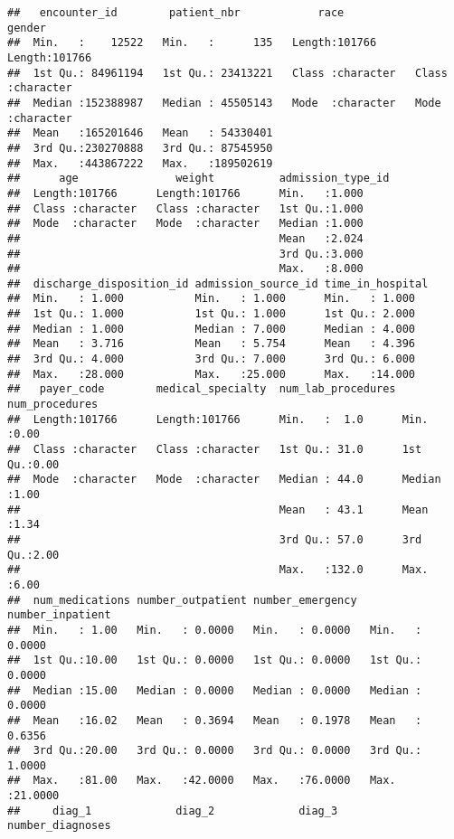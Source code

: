 \documentclass[
]{article}
\begin{document}
\begin{verbatim}
##   encounter_id        patient_nbr            race              gender         
##  Min.   :    12522   Min.   :      135   Length:101766      Length:101766     
##  1st Qu.: 84961194   1st Qu.: 23413221   Class :character   Class :character  
##  Median :152388987   Median : 45505143   Mode  :character   Mode  :character  
##  Mean   :165201646   Mean   : 54330401                                        
##  3rd Qu.:230270888   3rd Qu.: 87545950                                        
##  Max.   :443867222   Max.   :189502619                                        
##      age               weight          admission_type_id
##  Length:101766      Length:101766      Min.   :1.000    
##  Class :character   Class :character   1st Qu.:1.000    
##  Mode  :character   Mode  :character   Median :1.000    
##                                        Mean   :2.024    
##                                        3rd Qu.:3.000    
##                                        Max.   :8.000    
##  discharge_disposition_id admission_source_id time_in_hospital
##  Min.   : 1.000           Min.   : 1.000      Min.   : 1.000  
##  1st Qu.: 1.000           1st Qu.: 1.000      1st Qu.: 2.000  
##  Median : 1.000           Median : 7.000      Median : 4.000  
##  Mean   : 3.716           Mean   : 5.754      Mean   : 4.396  
##  3rd Qu.: 4.000           3rd Qu.: 7.000      3rd Qu.: 6.000  
##  Max.   :28.000           Max.   :25.000      Max.   :14.000  
##   payer_code        medical_specialty  num_lab_procedures num_procedures
##  Length:101766      Length:101766      Min.   :  1.0      Min.   :0.00  
##  Class :character   Class :character   1st Qu.: 31.0      1st Qu.:0.00  
##  Mode  :character   Mode  :character   Median : 44.0      Median :1.00  
##                                        Mean   : 43.1      Mean   :1.34  
##                                        3rd Qu.: 57.0      3rd Qu.:2.00  
##                                        Max.   :132.0      Max.   :6.00  
##  num_medications number_outpatient number_emergency  number_inpatient 
##  Min.   : 1.00   Min.   : 0.0000   Min.   : 0.0000   Min.   : 0.0000  
##  1st Qu.:10.00   1st Qu.: 0.0000   1st Qu.: 0.0000   1st Qu.: 0.0000  
##  Median :15.00   Median : 0.0000   Median : 0.0000   Median : 0.0000  
##  Mean   :16.02   Mean   : 0.3694   Mean   : 0.1978   Mean   : 0.6356  
##  3rd Qu.:20.00   3rd Qu.: 0.0000   3rd Qu.: 0.0000   3rd Qu.: 1.0000  
##  Max.   :81.00   Max.   :42.0000   Max.   :76.0000   Max.   :21.0000  
##     diag_1             diag_2             diag_3          number_diagnoses

\end{verbatim}
\end{document}
